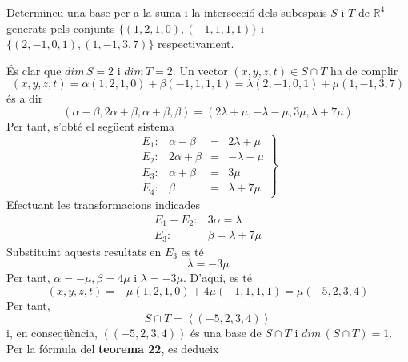 \begin{exemple}
Determineu una base per a la suma i la intersecció dels subespais $%
S$ i $T$ de $\mathbb{R}^{4}$ generats pels conjunts 
$\{(1,2,1,0),(-1,1,1,1)\}$ i $\{(2,-1,0,1),(1,-1,3,7)\}$ respectivament.

\end{exemple}
\begin{solucio}
És clar que $dim\,S=2$ i $dim\,T=2$. Un vector $%
(x,y,z,t)\in S\cap T$ ha de complir%
\begin{equation*}
(x,y,z,t)=\alpha (1,2,1,0)+\beta (-1,1,1,1)=\lambda (2,-1,0,1)+\mu (1,-1,3,7)
\end{equation*}%
és a dir%
\begin{equation*}
(\alpha -\beta ,2\alpha +\beta ,\alpha +\beta ,\beta )=(2\lambda +\mu
,-\lambda -\mu ,3\mu ,\lambda +7\mu )
\end{equation*}%
Per tant, s’obté el següent sistema%
\begin{equation*}
\left. 
\begin{array}{rrrr}
E_{1}: & \alpha -\beta & = & 2\lambda +\mu \\ 
E_{2}: & 2\alpha +\beta & = & -\lambda -\mu \\ 
E_{3}: & \alpha +\beta & = & 3\mu \\ 
E_{4}: & \beta & = & \lambda +7\mu%
\end{array}%
\right\}
\end{equation*}%
Efectuant les transformacions indicades%
\begin{equation*}
\begin{array}{cc}
E_{1}+E_{2}: & 3\alpha =\lambda \\ 
E_{3}: & \beta =\lambda +7\mu%
\end{array}%
\end{equation*}%
Substituint aquests resultats en $E_{3}$ es té%
\begin{equation*}
\lambda =-3\mu
\end{equation*}%
Per tant, $\alpha =-\mu ,\beta =4\mu $ i $\lambda =-3\mu $. D’aquí, es
té%
\begin{equation*}
(x,y,z,t)=-\mu (1,2,1,0)+4\mu (-1,1,1,1)=\mu (-5,2,3,4)
\end{equation*}%
Per tant,%
\begin{equation*}
S\cap T=\left\langle (-5,2,3,4)\right\rangle
\end{equation*}%
i, en conseqüència, $((-5,2,3,4))$ és una base de $S\cap T$
i $dim\,(S\cap T)=1$. Per la fórmula del \textbf{%
teorema 22}, es dedueix%
\begin{equation*}

\end{equation*}
\end{solucio}
